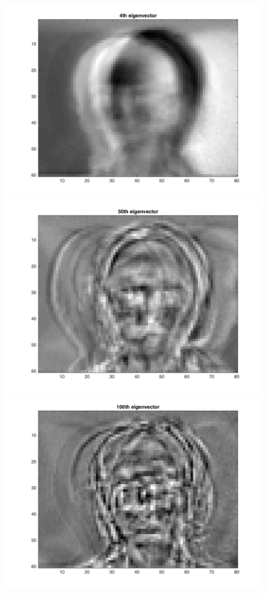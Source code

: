 \documentclass{article}
\begin{document}
\begin{figure}[H]
  \includegraphics[scale =.5]{report7_4}
\includegraphics[scale =.5]{report7_5}
\includegraphics[scale =.5]{report7_6}
\end{figure}
\end{document}
